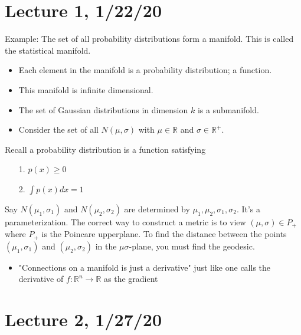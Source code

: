 \documentclass[12pt,letterpaper,boxed]{maths_v5}
\newcommand{\rr}{\mathbb{R}}
\theoremstyle{definition}
\begin{document}
    \section*{Lecture 1, 1/22/20}
    Example: The set of all probability distributions form a manifold. 
    This is called the statistical manifold. 
    \begin{itemize}
        \item Each element in the manifold is a probability distribution; a function. 
        \item This manifold is infinite dimensional. 
        \item The set of Gaussian distributions in dimension $k$ is a submanifold. 
        \item Consider the set of all $N(\mu, \sigma)$ with $\mu \in \rr$ and $\sigma \in \rr^{+}$.
    \end{itemize}    
    Recall a probability distribution is a  function satisfying 
    \begin{itemize}
        \item[1.] $p(x) \ge 0$ 
        \item[2.] $\displaystyle \int p(x)dx = 1$ 
    \end{itemize}
    Say $N(\mu_1, \sigma_1)$ and $N(\mu_2, \sigma_2)$ are determined by 
    $\mu_1, \mu_2, \sigma_1, \sigma_2$. It's a parameterization. The correct
    way to construct a metric is to view $(\mu, \sigma) \in P_{+}$ 
    where $P_{+}$ is the Poincare upperplane. To find the distance between the points 
    $(\mu_1, \sigma_1)$ and $(\mu_2, \sigma_2)$ in the $\mu\sigma$-plane, you must find the 
    geodesic. 
    \begin{itemize}
        \item "Connections on a manifold is just a derivative" just like one 
        calls the derivative of $f: \rr^n \to \rr$ as the gradient
    \end{itemize}

    \section*{Lecture 2, 1/27/20}
\end{document}
